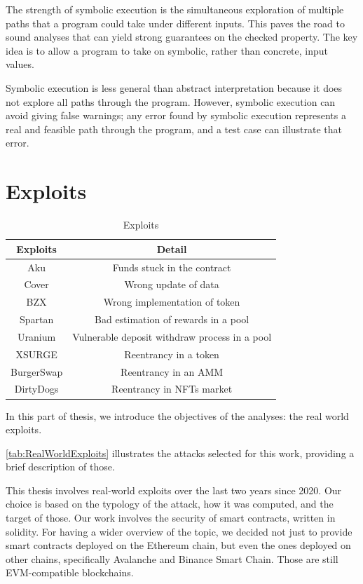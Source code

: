 The strength of symbolic execution is the simultaneous exploration of multiple paths
that a program could take under different inputs. This paves the road to sound analyses that can yield strong guarantees on the checked property. 
The key idea is to allow a program to take on
symbolic, rather than concrete, input values. 

Symbolic execution is less general than abstract interpretation because it does not explore all paths through the program. 
However, symbolic execution can avoid giving false warnings; any error found by symbolic execution represents a real and feasible path through the program, 
and a test case can illustrate that error.


\chapter{Exploits}
\label{ch:Exploits}
\begin{center}

\begin{table}
    \caption{Exploits}
        \label{tab:RealWorldExploits}
        \begin{tabular}{cc}
        \toprule
            Exploits & Detail\\
            \midrule
            Aku & Funds stuck in the contract\\
            Cover & Wrong update of data\\
            BZX & Wrong implementation of token\\
            Spartan &  Bad estimation of rewards in a pool\\
            Uranium & Vulnerable deposit withdraw process in a pool\\
            XSURGE &  Reentrancy in a token \\
            BurgerSwap &  Reentrancy in an AMM \\
            DirtyDogs &  Reentrancy in NFTs market \\
        \bottomrule
        \end{tabular}
    \end{table}    
\end{center}

In this part of thesis, we introduce the objectives of the analyses: the real world exploits. 

\autoref{tab:RealWorldExploits} illustrates the attacks selected for this work, providing a brief description of those. 

This thesis involves real-world exploits over the last two years since 2020. 
Our choice is based on the typology of the attack, how it was computed, and the target of those. 
Our work involves the security of smart contracts, written in solidity. 
For having a wider overview of the topic, 
we decided not just to provide smart contracts deployed on the Ethereum chain, 
but even the ones deployed on other chains, specifically Avalanche and Binance Smart Chain. 
Those are still EVM-compatible blockchains. 

